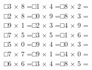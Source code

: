 \documentclass[uplatex,
paper=a4,
fontsize=18pt,
jafontsize=16pt,
number_of_lines=30,
line_length=30zh,
baselineskip=25pt,
]{jlreq}
\begin{document}
□\hspace{1em}3 × 8 =\hspace{3em}□\hspace{1em}1 × 4 =\hspace{3em}□\hspace{1em}8 × 2 =\hspace{3em}
\\

□\hspace{1em}2 × 8 =\hspace{3em}□\hspace{1em}0 × 9 =\hspace{3em}□\hspace{1em}8 × 3 =\hspace{3em}
\\

□\hspace{1em}9 × 1 =\hspace{3em}□\hspace{1em}2 × 3 =\hspace{3em}□\hspace{1em}4 × 9 =\hspace{3em}
\\

□\hspace{1em}7 × 5 =\hspace{3em}□\hspace{1em}3 × 5 =\hspace{3em}□\hspace{1em}1 × 6 =\hspace{3em}
\\

□\hspace{1em}5 × 0 =\hspace{3em}□\hspace{1em}9 × 4 =\hspace{3em}□\hspace{1em}0 × 3 =\hspace{3em}
\\

□\hspace{1em}7 × 7 =\hspace{3em}□\hspace{1em}9 × 1 =\hspace{3em}□\hspace{1em}4 × 0 =\hspace{3em}
\\

□\hspace{1em}6 × 6 =\hspace{3em}□\hspace{1em}3 × 4 =\hspace{3em}□\hspace{1em}8 × 5 =\hspace{3em}
\\
\end{document}
